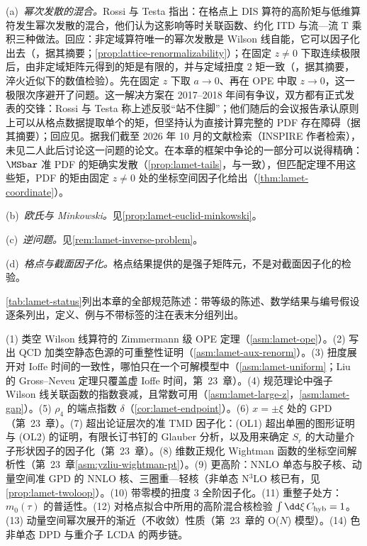 \begin{remark}[批评与回应]\label{rem:lattice-critiques}
(a)~\emph{幂次发散的混合。}Rossi 与 Testa 指出\cite{Rossi:2017muf,Rossi:2018zkn}：在格点上 DIS 算符的高阶矩与低维算符发生幂次发散的混合，他们认为这影响等时关联函数、约化 ITD 与流—流 T 乘积三种做法。回应：非定域算符唯一的幂次发散是 Wilson 线自能，它可以因子化出去（\cite{Ji:2017rah}，据其摘要；\cref{prop:lattice-renormalizability}）；在固定 $z\neq0$ 下取连续极限后，由非定域矩阵元得到的矩是有限的，并与定域扭度 2 矩一致（\cite{Karpie:2018zaz}，据其摘要，淬火近似下的数值检验）。先在固定 $z$ 下取 $a\to0$、再在 OPE 中取 $z\to0$，这一极限次序避开了问题。这一解决方案在 2017--2018 年间有争议，双方都有正式发表的交锋：Rossi 与 Testa 称上述反驳“站不住脚”\cite[第~3.1~节]{Rossi:2018zkn}；他们随后的会议报告承认原则上可以从格点数据提取单个的矩，但坚持认为直接计算完整的 PDF 存在障碍\cite{Rossi:2018stq}（据其摘要）；回应见\cite{Karpie:2018zaz,Radyushkin:2018nbf}。据我们截至 2026 年 10 月的文献检索（INSPIRE 作者检索），未见二人此后讨论这一问题的论文。在本章的框架中争论的一部分可以说得精确：$\MSbar$ 准 PDF 的矩确实发散（\cref{prop:lamet-tails}，与\cite{Radyushkin:2018nbf}一致），但匹配定理不用这些矩，PDF 的矩由固定 $z\neq0$ 处的坐标空间因子化给出（\cref{thm:lamet-coordinate}）。

(b)~\emph{欧氏与 Minkowski。}见\cref{prop:lamet-euclid-minkowski}。

(c)~\emph{逆问题。}见\cref{rem:lamet-inverse-problem}。

(d)~\emph{格点与截面因子化。}格点结果提供的是强子矩阵元，不是对截面因子化的检验。
\end{remark}

\cref{tab:lamet-status}列出本章的全部规范陈述：带等级的陈述、数学结果与编号假设逐条列出，定义、例与不带标签的注在表末分组列出。

\begin{remark}[开放问题]\label{rem:lamet-open}
(1) 类空 Wilson 线算符的 Zimmermann 级 OPE 定理（\cref{asm:lamet-ope}）。(2) 写出 QCD 加类空静态色源的可重整性证明（\cref{asm:lamet-aux-renorm}）。(3) 扭度展开对 Ioffe 时间的一致性，哪怕只在一个可解模型中（\cref{asm:lamet-uniform}；Liu 的 Gross--Neveu 定理只覆盖虚 Ioffe 时间，第~23~章）。(4) 规范理论中强子 Wilson 线关联函数的指数衰减，且常数可用（\cref{asm:lamet-large-z}，\cref{asm:lamet-gap}）。(5) $\rho_4$ 的端点指数 $\delta$（\cref{cor:lamet-endpoint}）。(6) $x=\pm\xi$ 处的 GPD（第~23~章）。(7) 超出论证层次的准 TMD 因子化：(OL1) 超出单圈的图形证明与 (OL2) 的证明，有限长订书钉的 Glauber 分析，以及用来确定 $S_r$ 的大动量介子形状因子的因子化（第~23~章）。(8) 维数正规化 Wightman 函数的坐标空间解析性（第~23~章\cref{asm:yzliu-wightman-pt}）。(9) 更高阶：NNLO 单态与胶子核、动量空间准 GPD 的 NNLO 核、三圈重—轻核（非单态 N$^3$LO 核已有\cite{Cheng:2024wyu}，见\cref{prop:lamet-twoloop}）。(10) 带零模的扭度 3 全阶因子化。(11) 重整子处方：$m_0(\tau)$ 的普适性。(12) 对格点拟合中所用的高阶混合核检验 $\int\dd\xi\,C_{\rm hyb}=1$。(13) 动量空间幂次展开的渐近（不收敛）性质（第~23~章的 O($N$) 模型）。(14) 色非单态 DPD 与重介子 LCDA 的两步链。
\end{remark}

